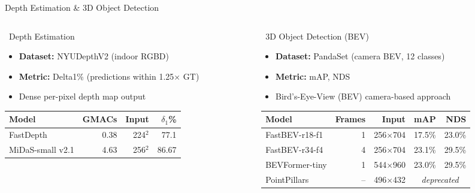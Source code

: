 \documentclass[aspectratio=169,12pt]{beamer}
\begin{document}
\begin{frame}{Depth Estimation \& 3D Object Detection}
  \begin{columns}[T]
    \begin{column}{0.46\textwidth}
      \begin{block}{\faRulerCombined~Depth Estimation}
        \begin{itemize}\footnotesize
          \item \textbf{Dataset:} NYUDepthV2 (indoor RGBD)
          \item \textbf{Metric:} Delta1\% (predictions within 1.25× GT)
          \item Dense per-pixel depth map output
        \end{itemize}
      \end{block}

      \vspace{0.2cm}
      \footnotesize
      \begin{tabular}{lrrr}
        \toprule
        \textbf{Model} & \textbf{GMACs} & \textbf{Input} & \textbf{$\delta_1$\%} \\
        \midrule
        \rowcolor{TIGray} FastDepth & 0.38 & 224$^2$ & 77.1 \\
        MiDaS-small v2.1 & 4.63 & 256$^2$ & 86.67 \\
        \bottomrule
      \end{tabular}
    \end{column}

    \begin{column}{0.50\textwidth}
      \begin{block}{\faCar~3D Object Detection (BEV)}
        \begin{itemize}\footnotesize
          \item \textbf{Dataset:} PandaSet (camera BEV, 12 classes)
          \item \textbf{Metric:} mAP, NDS
          \item Bird's-Eye-View (BEV) camera-based approach
        \end{itemize}
      \end{block}

      \vspace{0.2cm}
      \scriptsize
      \begin{tabular}{lrrrr}
        \toprule
        \textbf{Model} & \textbf{Frames} & \textbf{Input} & \textbf{mAP} & \textbf{NDS} \\
        \midrule
        \rowcolor{TIGray} FastBEV-r18-f1 & 1 & 256$\times$704 & 17.5\% & 23.0\% \\
        FastBEV-r34-f4 & 4 & 256$\times$704 & 23.1\% & 29.5\% \\
        \rowcolor{TIGray} BEVFormer-tiny & 1 & 544$\times$960 & 23.0\% & 29.5\% \\
        PointPillars & -- & 496$\times$432 & \multicolumn{2}{c}{\textit{deprecated}} \\
        \bottomrule
      \end{tabular}


\end{column}
\end{columns}
\end{frame}
\end{document}
